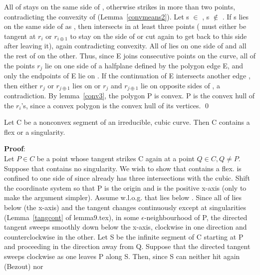 All of  stays on the same side of , otherwise  strikes
 in more than two points, contradicting the convexity of 
(Lemma~\ref{convmeans2}).
Let s $\in$ , s $\not\in$ .  If s lies on the same side of
 as , then  intersects  in at least three
points ( must either be tangent at $r_{i}$ or $r_{i\oplus 1}$
to stay on the  side of  or cut  again to get 
back to this side after leaving it), again contradicting convexity.
\hence All of  lies on one side of  and all the rest of
 on the other.  Thus, since E joins consecutive points on the
curve, all of the points $r_{j}$ lie on one side of a halfplane defined
by the polygon edge E, and only the endpoints of E lie on .
If the continuation  of E intersects another edge
, then either $r_{j}$ or $r_{j\oplus 1}$ lies
on  or $r_{j}$ and $r_{j\oplus 1}$ lie on opposite sides of ,
a contradiction.
\hence By lemma~\ref{conv3}, the polygon P is convex.
\hence P is the convex hull of the $r_{i}$'s, since a convex polygon is
the convex hull of its vertices.  
\qed
\begin{lemma}\nopagebreak
\label{flexorsi}
Let C be a nonconvex segment of an irreducible, cubic curve.
Then C contains a flex or a singularity.
\end{lemma}
{\bf Proof}:\nopagebreak\\
Let $P \in C$ be a point whose tangent strikes C again at a point
$Q \in C, Q \neq P$.
Suppose that  contains no singularity.
We wish to show that  contains a flex.
 is confined to one side of  since  already
has three intersections with the cubic. 
Shift the coordinate system so that P is the origin and  is the
positive x-axis (only to make the argument simpler).
Assume w.l.o.g. that  lies below .
Since all of  lies below  (the x-axis) and the tangent
changes continuously except at singularities (Lemma~\ref{tangcont} of 
lemma9.tex), in some 
$\epsilon$-neighbourhood of P, the directed tangent sweeps smoothly
down below the x-axis, clockwise in one direction and counterclockwise
 in the other.
Let S be the infinite segment of C starting at P and proceeding in the
direction away from Q.  
Suppose that the directed tangent sweeps clockwise as one leaves
P along S.  Then, since S can neither hit  again (Bezout) nor
